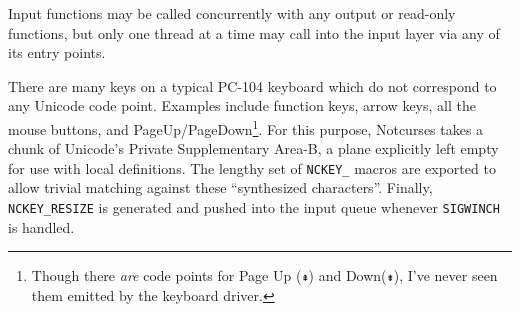Input functions may be called concurrently with any output or read-only
functions, but only one thread at a time may call into the input layer via any
of its entry points.

There are many keys on a typical PC-104 keyboard which do not correspond to any
Unicode code point. Examples include function keys, arrow keys, all the mouse
buttons, and PageUp/PageDown\footnote{Though there \textit{are} code points for
Page Up (\texttt{⇞}) and Down(\texttt{⇟}), I've never seen them emitted by the keyboard driver.}.
For this purpose, Notcurses takes a chunk of Unicode's Private Supplementary Area-B,
a plane explicitly left empty for use with local definitions. The lengthy set
of \texttt{NCKEY\_} macros are exported to allow trivial matching against
these ``synthesized characters''. Finally, \texttt{NCKEY\_RESIZE} is generated
and pushed into the input queue whenever \texttt{SIGWINCH} is handled.
